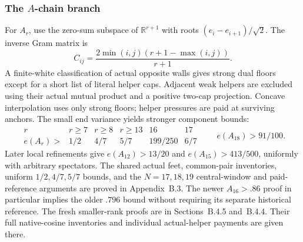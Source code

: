 \documentclass[11pt]{article}
\theoremstyle{remark}\newtheorem{remark}[theorem]{Remark}
\numberwithin{equation}{section}
\newcommand{\R}{\mathbb R}
\begin{document}
\subsubsection[The A-chain branch]{The \(A\)-chain branch}
For \(A_r\), use the zero-sum subspace of \(\R^{r+1}\) with roots
 \((e_i-e_{i+1})/\sqrt2\). The inverse Gram matrix is
 \[
 C_{ij}=\frac{2\min(i,j)(r+1-\max(i,j))}{r+1}.
\]
A finite-white classification of actual opposite walls gives
strong dual floors except for a short list of literal helper caps.
Adjacent weak helpers are excluded using their actual mutual
product and a positive two-cap projection. Concave interpolation
uses only strong floors; helper pressures are paid at surviving
anchors. The small end variance yields stronger component bounds:
\[
\begin{array}{c|ccccc}
r&r\geq7&r\geq8&r\geq13&16&17\\ \hline
e(A_r)>&1/2&4/7&5/7&199/250&6/7
\end{array}
\qquad e(A_{18})>91/100.
\]
Later local refinements give \(e(A_{12})>13/20\) and
 \(e(A_{15})>413/500\), uniformly with arbitrary spectators.
The shared actual feet, common-pair inventories, uniform
 \(1/2,4/7,5/7\) bounds, and the \(N=17,18,19\) central-window
and paid-reference arguments are proved in Appendix~B.3.
The newer \(A_{16}>.86\) proof in particular implies the older
 \(.796\) bound without requiring its separate historical reference.
The fresh smaller-rank proofs are in Sections~B.4.5
and~B.4.4. Their full native-cosine inventories and
individual actual-helper payments are given there.
\end{document}
